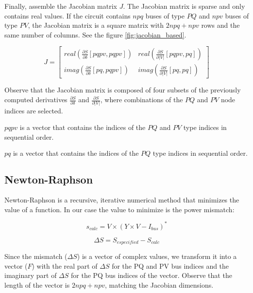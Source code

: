 \documentclass{tufte-book}
\begin{document}
Finally, assemble the Jacobian matrix $J$. The Jacobian matrix is sparse and only contains real values. If the circuit contains $npq$ buses of type $PQ$ and $npv$ buses of type $PV$, the Jacobian matrix is a square matrix with $2 npq + npv$ rows and the same number of columns. See the figure \ref{fig:jacobian_based}.

\begin{equation}
J=
\left[
\begin{array}{cc}
real\left(\frac{\partial S}{\partial \delta}[pqpv, pqpv]\right) &
real\left(\frac{\partial S}{\partial |V|}[pqpv, pq]\right) \\
imag\left(\frac{\partial S}{\partial \delta}[pq, pqpv]\right) &
imag\left(\frac{\partial S}{\partial |V|}[pq, pq]\right)
\end{array}
\right]
\end{equation}

Observe that the Jacobian matrix is composed of four subsets of the previously computed derivatives $\frac{\partial S}{\partial \delta}$ and $\frac{\partial S}{\partial |V|}$, where combinations of the $PQ$ and $PV$ node indices are selected.

$pqpv$ is a vector that contains the indices of the $PQ$ and $PV$ type indices in sequential order.

$pq$ is a vector that contains the indices of the $PQ$  type indices in sequential order.

\newpage
\subsection{Newton-Raphson}

Newton-Raphson is a recursive, iterative numerical method that minimizes the value of a function. In our case the value to minimize is the power mismatch:

\begin{equation}
s_{calc} = V \times (Y \times V - I_{bus})^*
\label{eq:nr_Scalc}
\end{equation}

\begin{equation}
\Delta S = S_{especified} - S_{calc} 
\end{equation}


Since the mismatch ($\Delta S$) is a vector of complex values, we transform it into a vector ($F$) with the real part of $\Delta S$ for the PQ and PV bus indices and the imaginary part of $\Delta S$ for the PQ bus indices of the vector. Observe that the length of the vector is $2npq+npv$, matching the Jacobian dimensions.
\end{document}
